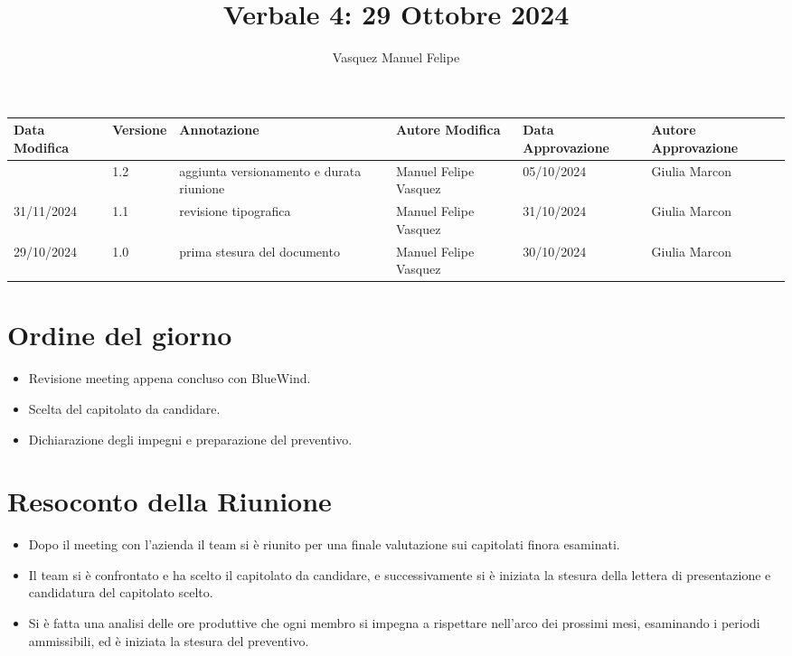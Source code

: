 \documentclass{TWReport}
\title{Verbale 4: 29 Ottobre 2024}
\author{Vasquez Manuel Felipe}
\begin{document}
\frontmatter

\begin{table}[h]
  \centering
  \renewcommand{\arraystretch}{1.5}
        \begin{tabularx}{\textwidth}{|>{\centering\arraybackslash}X|>{\centering\arraybackslash}X|>{\centering\arraybackslash}X|>{\centering\arraybackslash}X|>{\centering\arraybackslash}X|>{\centering\arraybackslash}X|}
        \hline
        \textbf{Data Modifica} & \textbf{Versione} & \textbf{Annotazione} & \textbf{Autore Modifica} & \textbf{Data Approvazione} & \textbf{Autore Approvazione} \\
        \hline
        {04/11/2024} & {1.2} & {aggiunta versionamento e durata riunione} & {Manuel Felipe Vasquez} & {05/10/2024} & {Giulia Marcon} \\
        \hline
        {31/11/2024} & {1.1} & {revisione tipografica} & {Manuel Felipe Vasquez} & {31/10/2024} & {Giulia Marcon} \\
        \hline
        {29/10/2024} & {1.0} & {prima stesura del documento} & {Manuel Felipe Vasquez} & {30/10/2024} & {Giulia Marcon} \\
        \hline
    \end{tabularx}
\end{table}
\newpage

\showPartecipants

	\section*{Ordine del giorno}

	\begin{itemize}
		\item Revisione meeting appena concluso con BlueWind.
		\item Scelta del capitolato da candidare.
		\item Dichiarazione degli impegni e preparazione del preventivo.

	\end{itemize}

	\section*{Resoconto della Riunione}
	\begin{itemize}

		\item Dopo il meeting con l'azienda il team si è riunito per una finale valutazione sui capitolati finora esaminati.

		\item Il team si è confrontato e ha scelto il capitolato da candidare, e successivamente si è iniziata la stesura della lettera di presentazione e candidatura del capitolato scelto.

		\item Si è fatta una analisi delle ore produttive che ogni membro si impegna a rispettare nell'arco dei prossimi mesi, esaminando i periodi ammissibili, ed è iniziata la stesura del preventivo.


	\end{itemize}
\end{document}
